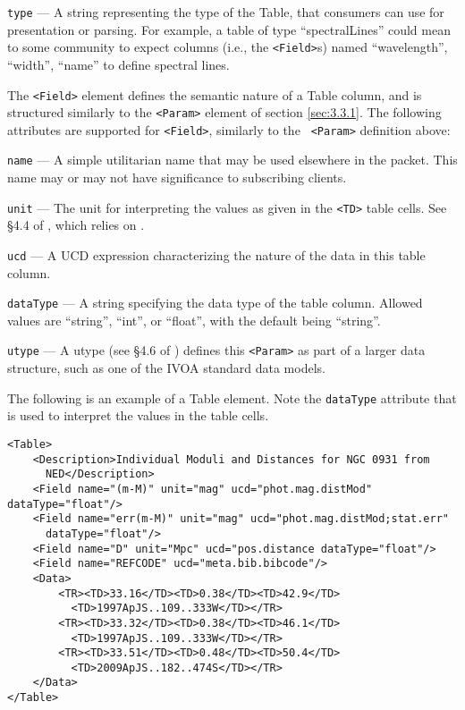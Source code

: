\documentclass[11pt,a4paper]{ivoa}
\begin{document}
 {\tt type}\label{sec:3.3.3.2} --- A string representing
the type of the Table, that consumers can use for presentation or parsing. For
example, a table of type ``spectralLines'' could mean to some community to
expect columns (i.e., the {\tt <Field>}s) named ``wavelength'', ``width'',
``name'' to define spectral lines.

The {\tt <Field>} element defines the semantic nature of a Table column, and is
structured similarly to the {\tt <Param>} element of section \ref{sec:3.3.1}.
The following attributes are supported for {\tt <Field>}, similarly to the {\tt
<Param>} definition above:

 {\tt name}\label{sec:3.3.3.3} --- A simple utilitarian
name that may be used elsewhere in the packet. This name may or may not have
significance to subscribing clients.

 {\tt unit}\label{sec:3.3.3.4} --- The unit for
interpreting the values as given in the {\tt <TD>} table cells. See \S4.4 of
\citet{2019ivoa.spec.1021O}, which relies on \citet{2014ivoa.spec.0523D}.

 {\tt ucd}\label{sec:3.3.3.5} --- A UCD
\citep{2018ivoa.spec.0527P} expression characterizing the nature of the data in
this table column.

 {\tt dataType}\label{sec:3.3.3.6} --- A string specifying
the data type of the table column. Allowed values are ``string'', ``int'', or
``float'', with the default being ``string''.

 {\tt utype}\label{sec:3.3.3.7} --- A utype (see \S4.6 of
\citet{2019ivoa.spec.1021O}) defines this {\tt <Param>} as part of a larger data
structure, such as one of the IVOA standard data models.

 The following is an example of a Table element. Note the {\tt dataType}
 attribute that is used to interpret the values in the table cells.
\begin{lstlisting}
<Table>
    <Description>Individual Moduli and Distances for NGC 0931 from
      NED</Description>
    <Field name="(m-M)" unit="mag" ucd="phot.mag.distMod" dataType="float"/>
    <Field name="err(m-M)" unit="mag" ucd="phot.mag.distMod;stat.err"
      dataType="float"/>
    <Field name="D" unit="Mpc" ucd="pos.distance dataType="float"/>
    <Field name="REFCODE" ucd="meta.bib.bibcode"/>
    <Data>
        <TR><TD>33.16</TD><TD>0.38</TD><TD>42.9</TD>
          <TD>1997ApJS..109..333W</TD></TR>
        <TR><TD>33.32</TD><TD>0.38</TD><TD>46.1</TD>
          <TD>1997ApJS..109..333W</TD></TR>
        <TR><TD>33.51</TD><TD>0.48</TD><TD>50.4</TD>
          <TD>2009ApJS..182..474S</TD></TR>
    </Data>
</Table>
\end{lstlisting}
\end{document}
